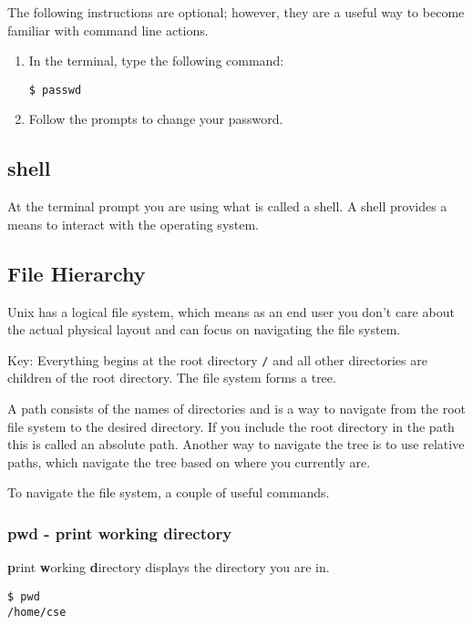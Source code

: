 \documentclass[12pt]{article}
\begin{document}
The following instructions are optional; however, they are a useful way to become familiar with command line actions.

\begin{enumerate}

\item In the terminal, type the following command:
\begin{lstlisting}[style=bash]
$ passwd
\end{lstlisting}
\item Follow the prompts to change your password.
\end{enumerate}

\subsection{shell}
At the terminal prompt you are using what is called a shell. A shell
provides a means to interact with the operating system.


\subsection{File Hierarchy}

Unix has a logical file system, which means as an end user you don't care about the
actual physical layout and can focus on navigating the file system.  

Key: Everything begins at the root directory
\texttt{/} and all other directories are children of the root directory. The
file system forms a tree.

A path consists of the names of directories and is a way to navigate from the root file system to the
desired directory. If you include the root directory in the path this
is called an absolute path. Another way to navigate the tree is to use
relative paths, which navigate the tree based on where you currently are.

To navigate the file system, a couple of useful commands.

\subsubsection{pwd - \textbf{p}rint \textbf{w}orking \textbf{d}irectory}

\textbf{p}rint \textbf{w}orking \textbf{d}irectory displays the
directory you are in.  

\begin{lstlisting}[style=bash]
$ pwd
/home/cse
\end{lstlisting}
\end{document}
